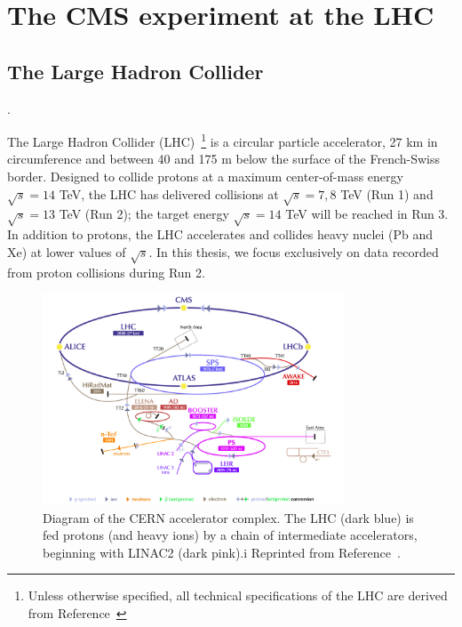 \chapter{The CMS experiment at the LHC}
\label{sec:cms}

\section{The Large Hadron Collider}
\label{sec:cms:lhc}.

The Large Hadron Collider (LHC)~\cite{lhcjinst}\footnote{Unless otherwise specified, all technical specifications of the LHC are derived from Reference~\cite{lhcjinst}} is a circular particle accelerator, 27 km in circumference and between 40 and 175 m below the surface of the French-Swiss border. 
Designed to collide protons at a maximum center-of-mass energy $\sqrt{s} = 14$ TeV, the LHC has delivered collisions at $\sqrt{s}=7,8$ TeV (Run 1) and $\sqrt{s} = 13$ TeV (Run 2); the target energy $\sqrt{s} = 14$ TeV will be reached in Run 3. 
In addition to protons, the LHC accelerates and collides heavy nuclei (Pb and Xe) at lower values of $\sqrt{s}$. 
In this thesis, we focus exclusively on data recorded from proton collisions during Run 2. 

\begin{figure}[]
    \begin{center}
        \includegraphics[width=0.8\textwidth]{figures/cms/lhc.png}
        \caption{Diagram of the CERN accelerator complex.
                 The LHC (dark blue) is fed protons (and heavy ions) by a chain of intermediate accelerators, beginning with LINAC2 (dark pink).i
                 Reprinted from Reference~\cite{lhcpic}. 
                    }
        \label{fig:cms:lhc}
    \end{center}
\end{figure}

